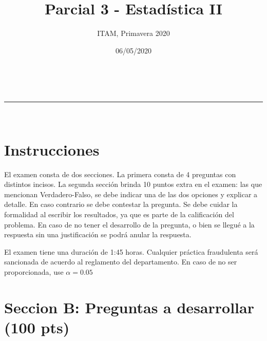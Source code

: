 \documentclass[addpoints]{exam}
\makeatletter
\newcommand{\linia}{\rule{\linewidth}{0.5pt}}
\theoremstyle{mytheor}
\renewcommand{\maketitle}{
    \begin{center}
    \vspace{2ex}
    {\huge \textsc{\@title}}
    \vspace{1ex}
    \\
    \linia\\
    \@author \hfill \@date
    \vspace{4ex}
    \end{center}
  }
\makeatother
\begin{document}
  
  \title{Parcial 3 - Estadística II}
  
  \author{ITAM, Primavera 2020}
  
  \date{06/05/2020}
  
  \maketitle
  
  \section*{Instrucciones}
  
  El examen consta de dos secciones. La primera consta de 4 preguntas con distintos incisos. La segunda sección brinda 10 puntos extra en el examen: las que mencionan Verdadero-Falso, se debe indicar una de las dos opciones y explicar a detalle. En caso contrario se debe contestar la pregunta. Se debe cuidar la formalidad al escribir los resultados, ya que es parte de la calificación del problema. En caso de no tener el desarrollo de la pregunta, o bien se llegué a la respuesta sin una justificación se podrá anular la respuesta. 
  
  \vspace{10pt}
  
  El examen tiene una duración de 1:45 horas. Cualquier práctica fraudulenta será sancionada de acuerdo al reglamento del departamento. En caso de no ser proporcionada, use $\alpha = 0.05$
  
  
  \section*{Seccion B: Preguntas a desarrollar (100 pts)}
  
\end{document}
